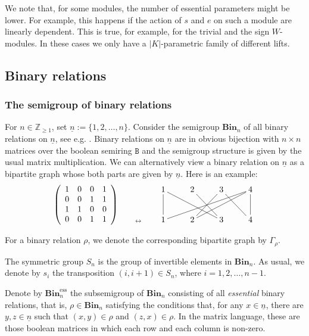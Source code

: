 \documentclass[a4paper]{amsart}
\begin{document}
We note that, for some modules, the number of essential parameters might 
be lower. For example, this happens if the action of $s$ and $e$ on such a module are linearly dependent.
This is true, for example, for the trivial and the sign $W$-modules. In these cases we only have 
a $|K|$-parametric family of different lifts.

\subsection{Binary relations}\label{s4.7}

\subsubsection{The semigroup of binary relations}\label{s4.7.1}

For $n\in\mathbb{Z}_{\geq 1}$, set  $\underline{n}:=\{1,2,\dots,n\}$. 
Consider the semigroup $\mathbf{Bin}_n$ of all binary relations on $\underline{n}$,
see e.g. \cite{PW70}.
Binary relations on $\underline{n}$ are in obvious bijection with $n\times n$ 
matrices over the boolean semiring $\mathtt{B}$ and the semigroup structure is given by the 
usual matrix multiplication. We can alternatively view a binary relation on
$\underline{n}$ as a bipartite graph whose both parts are given by $\underline{n}$.
Here is an example:
\begin{displaymath}
\begin{array}{ccc}
{}^{\left(\begin{array}{cccc}1&0&0&1\\0&0&1&1\\1&1&0&0\\0&0&1&1\\\end{array}\right)}& 
\quad {}^{\leftrightarrow}\quad       &
{}^{{}_{\xymatrix{1\ar@{-}[d]\ar@{-}[drr]&2\ar@{-}[dr]&3\ar@{-}[dl]\ar@{-}[dr]&4\ar@{-}[dlll]\ar@{-}[dll]\ar@{-}[d]
\\1&2&3&4}}}
\end{array}
\end{displaymath}
For a binary relation $\rho$, we denote the corresponding bipartite graph by 
$\Gamma_\rho$.

The symmetric group  $S_n$ is the group of invertible elements in $\mathbf{Bin}_n$.
As usual, we denote by $s_i$ the transposition $(i,i+1)\in S_n$, where
$i=1,2,\dots,n-1$.

Denote by $\mathbf{Bin}_n^\mathrm{ess}$ the subsemigroup of $\mathbf{Bin}_n$ consisting of
all  {\em essential} binary relations, that is, $\rho\in \mathbf{Bin}_n$ satisfying the 
conditions that, for any $x\in\underline{n}$, there are $y,z\in\underline{n}$
such that $(x,y)\in\rho$  and $(z,x)\in\rho$. In the matrix language, these are 
those boolean matrices in which each row and each column is non-zero.
\end{document}
